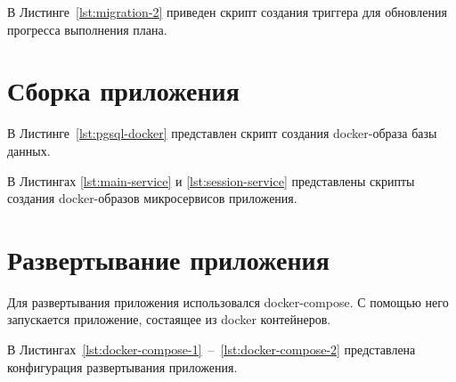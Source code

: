 \begin{appendices}
	\newpage
	
    В Листинге~\ref{lst:migration-2} приведен скрипт создания триггера для обновления прогресса выполнения плана.

	\newpage


	\chapter{Сборка приложения}

    В Листинге~\ref{lst:pgsql-docker} представлен скрипт создания docker-образа базы данных.


	 \newpage 
	 
 	В Листингах \ref{lst:main-service} и \ref{lst:session-service} представлены скрипты создания docker-образов микросервисов приложения.



	\chapter{Развертывание приложения}
	
	Для развертывания приложения использовался docker-compose. С помощью него запускается приложение, состаящее из docker контейнеров.
	
	 В Листингах~\ref{lst:docker-compose-1}~--~\ref{lst:docker-compose-2} представлена конфигурация развертывания приложения.
	 
	
	\newpage
	
\end{appendices}
